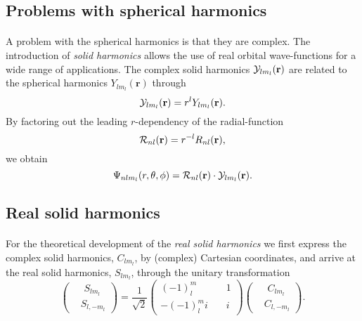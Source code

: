 \documentclass[%
twoside,                 %
final,                   %
10pt]{article}
\begin{document}
\subsection*{Problems with spherical harmonics}

\paragraph{}
A problem with the spherical harmonics is that they are complex. The introduction of \emph{solid harmonics} allows the use
of real orbital wave-functions for a wide range of applications. The
complex solid harmonics ${\cal Y}_{lm_l}(\mathbf{r})$ are related to
the spherical harmonics  $Y_{lm_l}(\mathbf{r})$ through
\begin{equation*}
  {\cal Y}_{lm_l}(\mathbf{r}) = r^l Y_{lm_l}(\mathbf{r}).
\end{equation*}
By factoring out the leading $r$-dependency of the radial-function
\begin{equation*}
  {\cal R}_{nl}(\mathbf{r}) = r^{-l} R_{nl}(\mathbf{r}),
\end{equation*}
we obtain 
\begin{equation*}
  \Psi_{nlm_l}(r,\theta, \phi) %
  = {\cal R}_{nl}(\mathbf{r})\cdot{\cal Y}_{lm_l}(\mathbf{r}).
\end{equation*}



\subsection*{Real solid harmonics}

\paragraph{}
For the theoretical development of the \emph{real solid harmonics} we first 
express the complex solid harmonics, $C_{lm_l}$, by (complex) Cartesian
coordinates, and arrive at the real solid harmonics, $S_{lm_l}$, through
the unitary transformation
\begin{equation*}
  \left( \begin{split} &\phantom{i} S_{lm_l} \\ 
    &S_{l,-m_l} \end{split} \right) 
  = \frac{1}{\sqrt{2}} \left(        \begin{split}
    (-1)^m_l \phantom{a} & \phantom{aa} 1 \\ 
    -(-1)^m_l i & \phantom{aa} i       \end{split} \right)  
  \left( \begin{split} &\phantom{i} C_{lm_l} \\ 
    &C_{l,-m_l} \end{split} \right).
\end{equation*}
\end{document}
